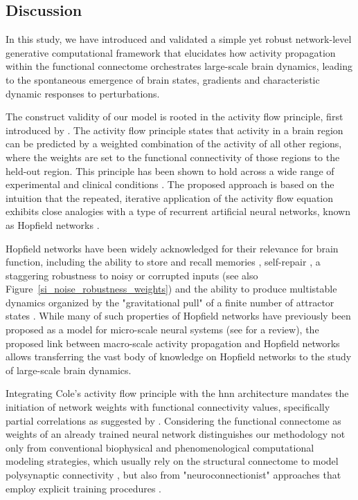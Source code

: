 \documentclass{article}
\begin{document}
\subsection{Discussion}

In this study, we have introduced and validated a simple yet robust network-level generative computational framework that elucidates how activity propagation within the functional connectome orchestrates large-scale brain dynamics, leading to the spontaneous emergence of brain states, gradients and characteristic dynamic responses to perturbations.

The construct validity of our model is rooted in the activity flow principle, first introduced by \citet{cole2016activity}. The activity flow principle states that activity in a brain region can be predicted by a weighted combination of the activity of all other regions, where the weights are set to the functional connectivity of those regions to the held-out region. This principle has been shown to hold across a wide range of experimental and clinical conditions \citep{cole2016activity, ito2017cognitive, mill2022network, hearne2021activity, chen2018human}.
The proposed approach is based on the intuition that the repeated, iterative application of the activity flow equation exhibits close analogies with a type of recurrent artificial neural networks, known as Hopfield networks \citep{hopfield1982neural}.

Hopfield networks have been widely acknowledged for their relevance for brain function, including the ability to store and recall memories \citep{hopfield1982neural}, self-repair \citep{murre2003selfreparing},
a staggering robustness to noisy or corrupted inputs \citep{hertz1991introduction} (see also Figure~\ref{si_noise_robustness_weights}) and the ability to produce multistable dynamics organized by the "gravitational pull" of a finite number of attractor states \citep{khona2022attractor}. While many of such properties of Hopfield networks have previously been proposed as a model for micro-scale neural systems (see \cite{khona2022attractor} for a review), the proposed link between macro-scale activity propagation and Hopfield networks allows transferring the vast body of knowledge on Hopfield networks to the study of large-scale brain dynamics.

Integrating Cole's activity flow principle with the \acrshort{hnn} architecture mandates the initiation of network weights with functional connectivity values, specifically partial correlations as suggested by \citet{cole2016activity}.
Considering the functional connectome as weights of an already trained neural network distinguishes our methodology not only from conventional biophysical and phenomenological computational modeling strategies, which usually rely on the structural connectome to model polysynaptic connectivity \citep{cabral2017functional}, but also from "neuroconnectionist" approaches that employ explicit training procedures \citep{doerig2023neuroconnectionist}.
\end{document}

